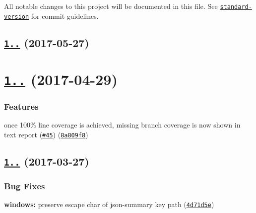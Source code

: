 All notable changes to this project will be documented in this file. See \href{https://github.com/conventional-changelog/standard-version}{\tt standard-\/version} for commit guidelines.

\label{_1.1.1}%
 \subsection*{\href{https://github.com/istanbuljs/istanbuljs/compare/istanbul-reports@1.1.0...istanbul-reports@1.1.1}{\tt 1..} (2017-\/05-\/27)}

\label{_1.1.0}%
 \section*{\href{https://github.com/istanbuljs/istanbul-reports/compare/istanbul-reports@1.0.2...istanbul-reports@1.1.0}{\tt 1..} (2017-\/04-\/29)}

\subsubsection*{Features}


\begin{DoxyItemize}
\item once 100\% line coverage is achieved, missing branch coverage is now shown in text report (\href{https://github.com/istanbuljs/istanbuljs/issues/45}{\tt \#45}) (\href{https://github.com/istanbuljs/istanbul-reports/commit/8a809f8}{\tt 8a809f8})
\end{DoxyItemize}

\label{_1.0.2}%
 \subsection*{\href{https://github.com/istanbuljs/istanbul-reports/compare/istanbul-reports@1.0.1...istanbul-reports@1.0.2}{\tt 1..} (2017-\/03-\/27)}

\subsubsection*{Bug Fixes}


\begin{DoxyItemize}
\item {\bfseries windows\+:} preserve escape char of json-\/summary key path (\href{https://github.com/istanbuljs/istanbul-reports/commit/4d71d5e}{\tt 4d71d5e})
\end{DoxyItemize}

